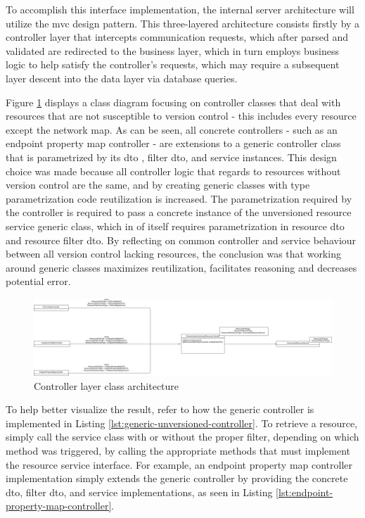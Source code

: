     To accomplish this interface implementation, the internal server architecture will utilize the \gls{mvc} design pattern.
    This three-layered architecture consists firstly by a controller layer that intercepts communication requests, which after parsed and validated are redirected to the business layer, which in turn employs business logic to help satisfy the controller's requests, which may require a subsequent layer descent into the data layer via database queries.

    Figure \ref{fig:controller-unversioned-architecture} displays a class diagram focusing on controller classes that deal with resources that are not susceptible to version control - this includes every resource except the network map.
    As can be seen, all concrete controllers - such as an endpoint property map controller - are extensions to a generic controller class that is parametrized by its \gls{dto} , filter \gls{dto}, and service instances.
    This design choice was made because all controller logic that regards to resources without version control are the same, and by creating generic classes with type parametrization code reutilization is increased.
    The parametrization required by the controller is required to pass a concrete instance of the unversioned resource service generic class, which in of itself requires parametrization in resource \gls{dto} and resource filter \gls{dto}.
    By reflecting on common controller and service behaviour between all version control lacking resources, the conclusion was that working around generic classes maximizes reutilization, facilitates reasoning and decreases potential error.

\begin{figure}[h]
\centering
\hspace*{-3em}
\includegraphics[scale=0.23]{img/controller-unversioned-architecture.png}
\caption{Controller layer class architecture}
\label{fig:controller-unversioned-architecture}
\end{figure}

    To help better visualize the result, refer to how the generic controller is implemented in Listing \ref{lst:generic-unversioned-controller}.
    To retrieve a resource, simply call the service class with or without the proper filter, depending on which method was triggered, by calling the appropriate methods that must implement the resource service interface.
    For example, an endpoint property map controller implementation simply extends the generic controller by providing the concrete \gls{dto}, filter \gls{dto}, and service implementations, as seen in Listing \ref{lst:endpoint-property-map-controller}.

